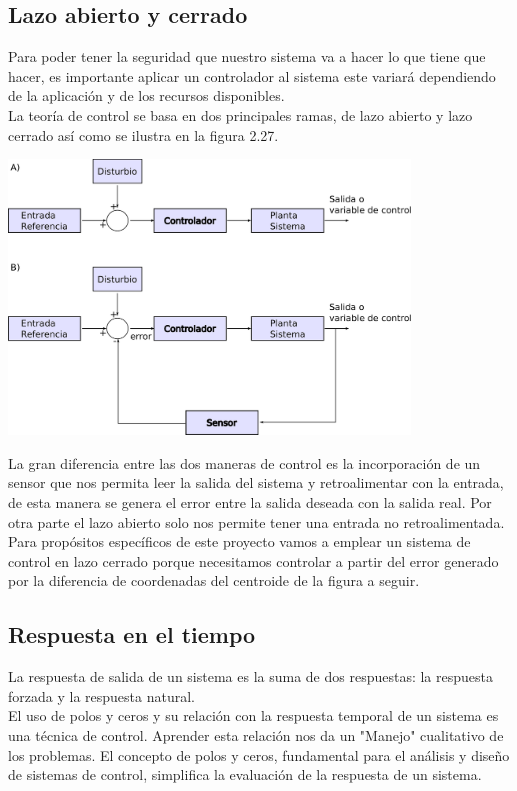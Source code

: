 \subsection{Lazo abierto y cerrado}
Para poder tener la seguridad que nuestro sistema va a hacer lo que tiene que hacer, es importante
aplicar un controlador al sistema este variará dependiendo de la aplicación y de los recursos
disponibles.\\
La teoría de control se basa en dos principales ramas, de lazo abierto y lazo cerrado así como se ilustra en la figura 2.27.
\begin{center}
	\includegraphics[width=0.8\textwidth]{Contenido/Cuerpo/Capitulo2/Fig21.eps}
	\label{fig:MarcoTeorico:Fig25}
\end{center}
La gran diferencia entre las dos maneras de control es la incorporación de un sensor que nos
permita leer la salida del sistema y retroalimentar con la entrada, de esta manera se genera
el error entre la salida deseada con la salida real. Por otra parte el lazo abierto solo nos permite
tener una entrada no retroalimentada.\\
Para propósitos específicos de este proyecto vamos a emplear un sistema de control en lazo cerrado
porque necesitamos controlar a partir del error generado por la diferencia de coordenadas del
centroide de la figura a seguir.

\subsection{Respuesta en el tiempo}
La respuesta de salida de un sistema es la suma de dos respuestas: la respuesta forzada y la respuesta natural.\\
El uso de polos y ceros y su relación con la respuesta temporal de un sistema es una técnica de control. Aprender esta relación nos da un
"Manejo" cualitativo de los problemas. El concepto de polos y ceros, fundamental para el análisis y diseño de sistemas de control, simplifica
la evaluación de la respuesta de un sistema.\cite{Book:Nise2010}
